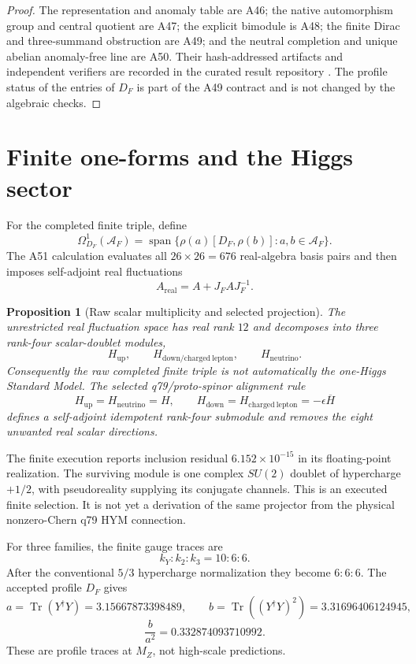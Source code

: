 \documentclass[11pt,a4paper,twoside]{article}
\theoremstyle{plain}
\newtheorem{proposition}[theorem]{Proposition}
\theoremstyle{definition}
\theoremstyle{remark}
\newcommand{\AF}{\mathcal{A}_{F}}
\newcommand{\DF}{D_{F}}
\newcommand{\Tr}{\operatorname{Tr}}
\begin{document}
\begin{proof}
The representation and anomaly table are A46; the native automorphism group
and central quotient are A47; the explicit bimodule is A48; the finite Dirac
and three-summand obstruction are A49; and the neutral completion and unique
abelian anomaly-free line are A50.  Their hash-addressed artifacts and
independent verifiers are recorded in the curated result repository
\cite{MTTResultsRepro2026}.  The profile status of the entries of $\DF$ is
part of the A49 contract and is not changed by the algebraic checks.
\end{proof}

\section{Finite one-forms and the Higgs sector}

For the completed finite triple, define
\[
 \Omega_{\DF}^{1}(\AF)
   =\operatorname{span}\{\rho(a)[\DF,\rho(b)]:a,b\in\AF\}.
\]
The A51 calculation evaluates all $26\times26=676$ real-algebra basis pairs
and then imposes self-adjoint real fluctuations
\[
 A_{\mathrm{real}}=A+J_FAJ_F^{-1}.
\]

\begin{proposition}[Raw scalar multiplicity and selected projection]
\label{prop:higgs}
The unrestricted real fluctuation space has real rank $12$ and decomposes
into three rank-four scalar-doublet modules,
\[
 H_{\mathrm{up}},\qquad
 H_{\mathrm{down/charged\ lepton}},\qquad
 H_{\mathrm{neutrino}}.
\]
Consequently the raw completed finite triple is not automatically the
one-Higgs Standard Model.  The selected q79/proto-spinor alignment rule
\[
 H_{\mathrm{up}}=H_{\mathrm{neutrino}}=H,\qquad
 H_{\mathrm{down}}=H_{\mathrm{charged\ lepton}}
   =-\epsilon\overline{H}
\]
defines a self-adjoint idempotent rank-four submodule and removes the eight
unwanted real scalar directions.
\end{proposition}

The finite execution reports inclusion residual
$6.152\times10^{-15}$ in its floating-point realization.  The surviving
module is one complex $SU(2)$ doublet of hypercharge $+1/2$, with
pseudoreality supplying its conjugate channels.  This is an executed finite
selection.  It is not yet a derivation of the same projector from the
physical nonzero-Chern q79 HYM connection.

For three families, the finite gauge traces are
\[
 k_Y:k_2:k_3=10:6:6.
\]
After the conventional $5/3$ hypercharge normalization they become
$6:6:6$.  The accepted profile $\DF$ gives
\[
 a=\Tr(Y^\dagger Y)=3.15667873398489,\qquad
 b=\Tr((Y^\dagger Y)^2)=3.31696406124945,
\]
\[
 \frac{b}{a^2}=0.332874093710992.
\]
These are profile traces at $M_Z$, not high-scale predictions.
\end{document}
